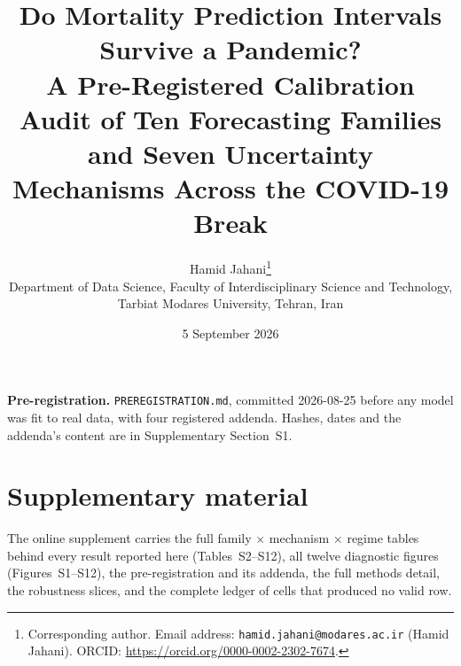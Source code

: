 \documentclass[11pt,a4paper]{article}
\title{Do Mortality Prediction Intervals Survive a Pandemic?\\[0.4em]
  \large A Pre-Registered Calibration Audit of Ten Forecasting Families and
  Seven Uncertainty Mechanisms Across the COVID-19 Break}
\author{%
  Hamid Jahani\thanks{Corresponding author.
    Email address: \texttt{hamid.jahani@modares.ac.ir} (Hamid Jahani).
    ORCID: \url{https://orcid.org/0000-0002-2302-7674}.}\\[0.45em]
  \normalsize Department of Data Science, Faculty of Interdisciplinary Science and Technology,\\
  \normalsize Tarbiat Modares University, Tehran, Iran}
\date{5 September 2026}
\begin{document}
\maketitle


\vspace{0.5em}
\noindent\textbf{Pre-registration.} \texttt{PREREGISTRATION.md}, committed 2026-08-25 before
any model was fit to real data, with four registered addenda. Hashes, dates and the addenda's
content are in Supplementary Section~S1.











\section*{Supplementary material}
The online supplement carries the full family $\times$ mechanism $\times$ regime tables behind
every result reported here (Tables~S2--S12), all twelve diagnostic figures
(Figures~S1--S12), the pre-registration and its addenda, the full methods detail, the
robustness slices, and the complete ledger of cells that produced no valid row.





\end{document}
